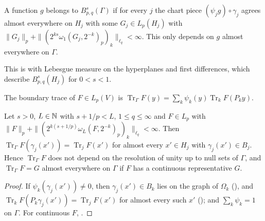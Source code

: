 \begin{definition}
\label{def:boundary-besov}
\leanok
{}
A function $g$ belongs to $B^s_{p,q}(\Gamma)$ if for every $j$ the chart piece
$(\psi_j g) \circ \gamma_j$ agrees almost everywhere on $H_j$ with some $G_j \in L_p(H_j)$ with
$\|G_j\|_p + \|(2^{ks} \omega_1(G_j, 2^{-k})_p)_k\|_{\ell_q} < \infty$. This only depends on $g$
almost everywhere on $\Gamma$.
\end{definition}

This is \cite[Definition 3.3]{SchneiderVybiral} with Lebesgue measure on the hyperplanes and first
differences, which describe $B^s_{p,q}(H_j)$ for $0 < s < 1$.

\begin{definition}
\label{def:boundary-trace}
\leanok
{}
The boundary trace of $F \in L_p(V)$ is
$\operatorname{Tr}_\Gamma F(y) = \sum_k \psi_k(y) \operatorname{Tr}_k F(P_k y)$.
\end{definition}

\begin{theorem}
\label{thm:boundary-trace-charts}
\leanok
{}
Let $s > 0$, $L \in \mathbb{N}$ with $s + 1/p < L$, $1 \leq q \leq \infty$ and $F \in L_p$ with
$\|F\|_p + \|(2^{k(s + 1/p)} \omega_L(F, 2^{-k})_p)_k\|_{\ell_q} < \infty$. Then
$\operatorname{Tr}_\Gamma F(\gamma_j(x')) = \operatorname{Tr}_j F(x')$ for almost every $x' \in H_j$
with $\gamma_j(x') \in B_j$. Hence $\operatorname{Tr}_\Gamma F$ does not depend on the resolution of
unity up to null sets of $\Gamma$, and $\operatorname{Tr}_\Gamma F = G$ almost everywhere on $\Gamma$
if $F$ has a continuous representative $G$.
\end{theorem}

\begin{proof}
\leanok
If $\psi_k(\gamma_j(x')) \neq 0$, then $\gamma_j(x') \in B_k$ lies on the graph of $\Omega_k$
(), and
$\operatorname{Tr}_k F(P_k \gamma_j(x')) = \operatorname{Tr}_j F(x')$ for almost every such $x'$
(); and $\sum_k \psi_k = 1$ on $\Gamma$. For continuous $F$,
.
\end{proof}

